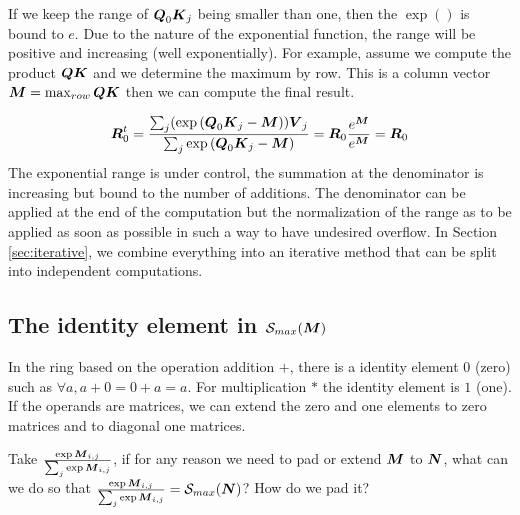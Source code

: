 \documentclass[journal]{IEEEtran}
\begin{document}
If we keep the range of ${\boldsymbol Q}_0{\boldsymbol K}_j$ being smaller than one,
then the $\exp()$ is bound to $e$. Due to the nature of the
exponential function, the range will be positive and increasing (well
exponentially). For example, assume we compute the product
${\boldsymbol Q}{\boldsymbol K}$ and we determine the maximum by row. This is a column
vector ${\boldsymbol M} = \max_{row} {\boldsymbol Q}{\boldsymbol K}$ then we can compute the
final result. 

\begin{equation}
  \label{eq:c}
  \Vc{R}_0^t = \frac{\sum_j(\exp{(\Vc{Q}_0\Vc{K}_j-\Vc{M})})\Vc{V}_j}{\sum_j\exp{(\Vc{Q}_0\Vc{K}_j-\Vc{M})}} =
     \Vc{R}_0\frac{e^{\Vc{M}}}{e^{\Vc{M}}}= \Vc{R}_0
\end{equation}
The exponential range is under control, the summation at the
denominator is increasing but bound to the number of additions.  The
denominator can be applied at the end of the computation but the
normalization of the range as to be applied as soon as possible in
such a way to have undesired overflow. In Section \ref{sec:iterative}, we combine
everything into an iterative method that can be split into independent
computations.

\subsection{The identity element in $\Smax{\Vc{M}}$}
\label{sec:identity}

In the ring based on the operation addition $+$, there is a identity
element $0$ (zero) such as $\forall a, a+0 = 0+a = a$. For
multiplication $*$ the identity element is $1$ (one). If the operands
are matrices, we can extend the zero and one elements to zero matrices
and to diagonal one matrices.

Take $\frac{\exp{{\boldsymbol M}_{i,j}}}{\sum_j\exp{{\boldsymbol M}_{i,j}}}$, if for any reason we need to pad or extend
${\boldsymbol M}$ to ${\boldsymbol N}$, what can we do so that $\Smaxd{\Vc{M}}=
\Smax{\Vc{N}}$? How do we pad it?
\end{document}
